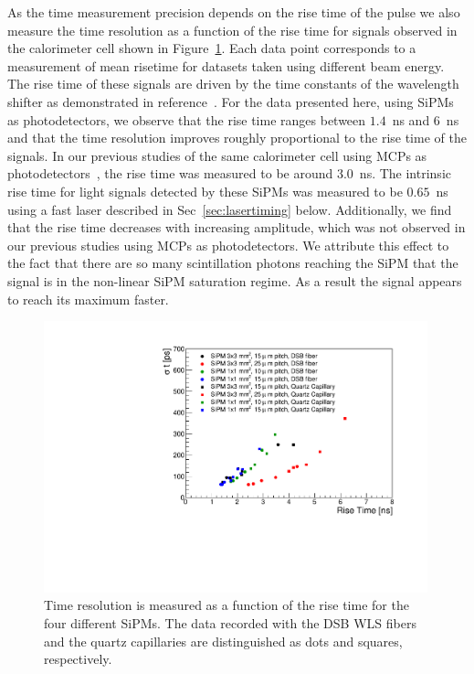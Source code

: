 As the time measurement precision depends on the rise time of the pulse we also
measure the time resolution as a function of the rise time for signals observed
in the calorimeter cell shown in Figure~\ref{RiseTime}. Each data point corresponds
to a measurement of mean risetime for datasets taken using different beam energy.
The rise time of these
signals are driven by the time constants of the wavelength shifter as
demonstrated in reference~\cite{Anderson:2015gha}. For the data presented here,
using SiPMs as photodetectors, we observe that the rise time ranges between
$1.4$~ns and $6$~ns and that the time resolution improves roughly proportional
to the rise time of the signals. In our previous studies of the same calorimeter 
cell using MCPs as photodetectors~\cite{Anderson:2015gha}, the rise time was measured to be around 
$3.0$~ns. The intrinsic rise time for light signals detected by these SiPMs was
measured to be $0.65$~ns using a fast laser described in Sec~\ref{sec:lasertiming} below. 
Additionally, we find that the rise time decreases with increasing amplitude, which was
not observed in our previous studies using MCPs as photodetectors. We attribute 
this effect to the fact that there are so many scintillation photons reaching the SiPM that
the signal is in the non-linear SiPM saturation regime. As a result the signal 
appears to reach its maximum faster. 

\begin{figure}[!htb]
\centering
\includegraphics[width=0.99\textwidth]{figures/ShashlikTimeResolutionVsRiseTime.pdf}
\caption{\label{RiseTime}Time resolution is measured as a function of the rise time
for the four different SiPMs. The data recorded with the DSB WLS fibers and the
quartz capillaries are distinguished as dots and squares, respectively. }
\end{figure}

